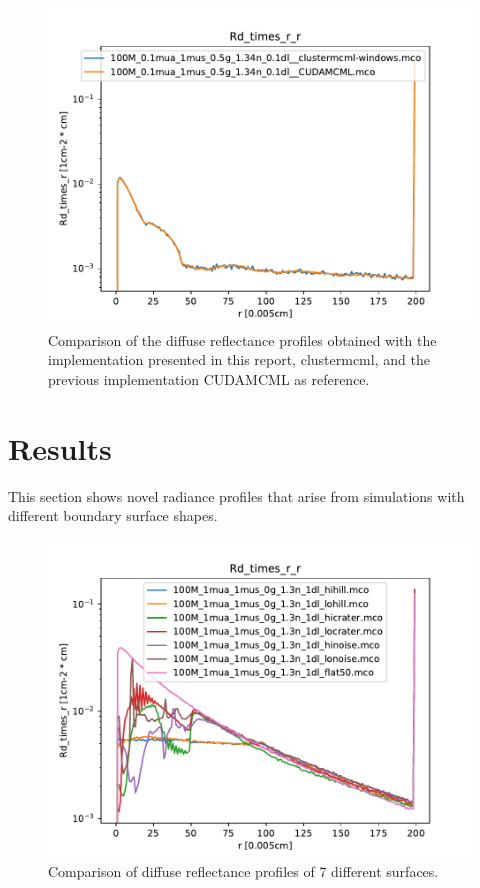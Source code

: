 \documentclass[]{article}
\begin{document}
\begin{figure}[ht!]
	\includegraphics[width=\linewidth]{img/verification1.pdf}
	\caption{Comparison of the diffuse reflectance profiles obtained with the implementation presented in this report, clustermcml, and the previous implementation CUDAMCML as reference.}
	\label{verification1}
\end{figure}

\section{Results}

This section shows novel radiance profiles that arise from simulations with different boundary surface shapes.

\begin{figure}[ht!]
	\includegraphics[width=\linewidth]{img/result1.pdf}
	\caption{Comparison of diffuse reflectance profiles of 7 different surfaces.}
	\label{result1}
\end{figure}
\end{document}
